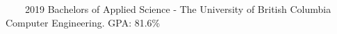 
~~~~2019 Bachelors of Applied Science - The University of British Columbia  Computer Engineering. GPA: 81.6\%
